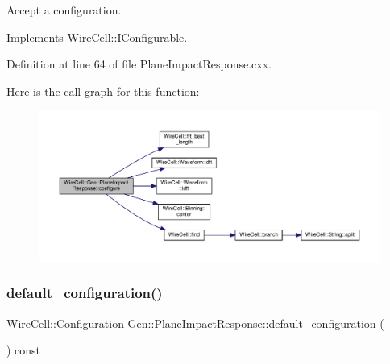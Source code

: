 Accept a configuration. 



Implements \hyperlink{class_wire_cell_1_1_i_configurable_a57ff687923a724093df3de59c6ff237d}{Wire\+Cell\+::\+I\+Configurable}.



Definition at line 64 of file Plane\+Impact\+Response.\+cxx.

Here is the call graph for this function\+:
\nopagebreak
\begin{figure}[H]
\begin{center}
\leavevmode
\includegraphics[width=350pt]{class_wire_cell_1_1_gen_1_1_plane_impact_response_a5ab969666fea20210311a3751db47db0_cgraph}
\end{center}
\end{figure}
\mbox{\label{class_wire_cell_1_1_gen_1_1_plane_impact_response_aa3ff90ee6b2da59981703b26ea36dd03}} 
\subsubsection{\texorpdfstring{default\+\_\+configuration()}{default\_configuration()}}
{\footnotesize\ttfamily \hyperlink{namespace_wire_cell_a9f705541fc1d46c608b3d32c182333ee}{Wire\+Cell\+::\+Configuration} Gen\+::\+Plane\+Impact\+Response\+::default\+\_\+configuration (\begin{DoxyParamCaption}{ }\end{DoxyParamCaption}) const\hspace{0.3cm}{\ttfamily [virtual]}}



